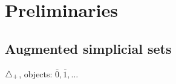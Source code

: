 
\section{Preliminaries} \label{s:preliminaries}

\subsection{Augmented simplicial sets}

$\triangle_+$, objects: $\bar{0}, \bar{1}, \dots$